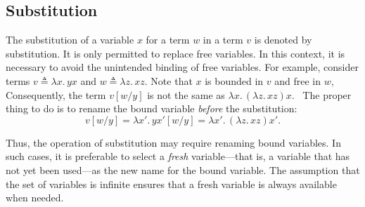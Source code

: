 \subsection{Substitution}



The substitution of a variable $x$ for a term $w$ in a term $v$ is denoted by \gls{substitution}. It is only permitted to replace free variables. In this context, it is necessary to avoid the unintended binding of free variables. For example, consider terms $ v \triangleq \lambda x. \, yx$ and $ w \triangleq \lambda z. \, xz$. Note that $x$ is bounded in $v$ and free in $w$, Consequently, the term $v[w/y]$ is not the same as $  \lambda x. \,  (\lambda z. \, xz) x$.  The proper thing to do is to rename the bound variable \emph{before} the substitution:
\[v[w/y] = \lambda x'. \, yx' [w/y]=  \lambda x'. \,  (\lambda z. \, xz) x'. \]

Thus, the operation of substitution may require renaming bound variables. 
In such cases, it is preferable to select a \emph{fresh} variable---that is, 
a variable that has not yet been used---as the new name for the bound variable. 
The assumption that the set of variables is infinite ensures that a fresh variable is always available when needed.

